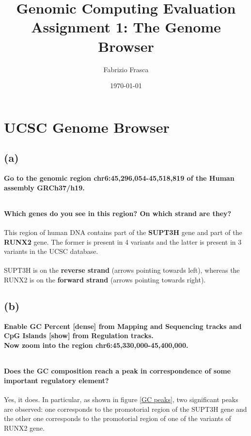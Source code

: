 \documentclass[12pt, a4paper]{article}
\title{\textbf{Genomic Computing Evaluation}\\Assignment 1: The Genome Browser}
\author{Fabrizio Frasca}
\date{\today}
\begin{document}
	
\maketitle
\clearpage

\section{UCSC Genome Browser}

\subsection*{(a)}

\textbf{Go to the genomic region chr6:45,296,054-45,518,819 of the Human assembly GRCh37/h19.}%

\textbf{\\ Which genes do you see in this region? On which strand are they?}%
\paragraph{} This region of human DNA contains part of the \textbf{SUPT3H} gene and part of the \textbf{RUNX2} gene. The former is present in 4 variants and the latter is present in 3 variants in the UCSC database.%
\paragraph{} SUPT3H is on the \textbf{reverse strand} (arrows pointing towards left), whereas the RUNX2 is on the \textbf{forward strand} (arrows pointing towards right).	

\subsection*{(b)}

\textbf{Enable GC Percent [dense] from Mapping and Sequencing tracks and CpG Islands [show] from Regulation tracks.\\ Now zoom into the region chr6:45,330,000-45,400,000.}%

\textbf{\\ Does the GC composition reach a peak in correspondence of some important regulatory element?}%
\paragraph{}Yes, it does. In particular, as shown in figure \ref{GC peaks}, two significant peaks are observed: one corresponds to the promotorial region of the SUPT3H gene and the other one corresponds to the promotorial region of one of the variants of RUNX2 gene.
\end{document}
